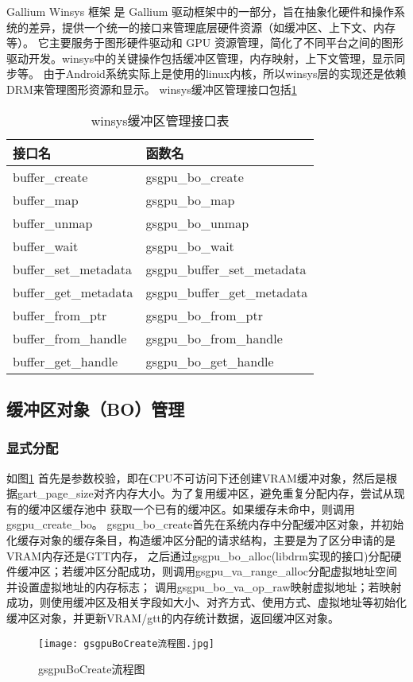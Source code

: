 Gallium Winsys 框架 是 Gallium 驱动框架中的一部分，旨在抽象化硬件和操作系统的差异，提供一个统一的接口来管理底层硬件资源（如缓冲区、上下文、内存等）。
它主要服务于图形硬件驱动和 GPU 资源管理，简化了不同平台之间的图形驱动开发。winsys中的关键操作包括缓冲区管理，内存映射，上下文管理，显示同步等。
由于Android系统实际上是使用的linux内核，所以winsys层的实现还是依赖DRM来管理图形资源和显示。
winsys缓冲区管理接口包括\ref{tab:winsys缓冲区管理接口表}

\begin{table}[h]
  \centering
  \caption{winsys缓冲区管理接口表}
  \label{tab:winsys缓冲区管理接口表}
  \begin{tabular}{ll}
    \toprule
    接口名  & 函数名 \\
    \midrule
    buffer\_create & gsgpu\_bo\_create  \\
    buffer\_map & gsgpu\_bo\_map \\
    buffer\_unmap & gsgpu\_bo\_unmap \\
    buffer\_wait & gsgpu\_bo\_wait \\
    buffer\_set\_metadata & gsgpu\_buffer\_set\_metadata \\
    buffer\_get\_metadata & gsgpu\_buffer\_get\_metadata \\
    buffer\_from\_ptr & gsgpu\_bo\_from\_ptr \\
    buffer\_from\_handle & gsgpu\_bo\_from\_handle \\
    buffer\_get\_handle & gsgpu\_bo\_get\_handle \\
    \bottomrule
  \end{tabular}
  \note{}
\end{table}

\subsection{缓冲区对象（BO）管理}

\subsubsection{显式分配}

如图\ref{fig:gsgpuBoCreate流程图}
首先是参数校验，即在CPU不可访问下还创建VRAM缓冲对象，然后是根据gart\_page\_size对齐内存大小。为了复用缓冲区，避免重复分配内存，尝试从现有的缓冲区缓存池中
获取一个已有的缓冲区。如果缓存未命中，则调用gsgpu\_create\_bo。
gsgpu\_bo\_create首先在系统内存中分配缓冲区对象，并初始化缓存对象的缓存条目，构造缓冲区分配的请求结构，主要是为了区分申请的是VRAM内存还是GTT内存，
之后通过gsgpu\_bo\_alloc(libdrm实现的接口)分配硬件缓冲区；若缓冲区分配成功，则调用gsgpu\_va\_range\_alloc分配虚拟地址空间并设置虚拟地址的内存标志；
调用gsgpu\_bo\_va\_op\_raw映射虚拟地址；若映射成功，则使用缓冲区及相关字段如大小、对齐方式、使用方式、虚拟地址等初始化缓冲区对象，并更新VRAM/gtt的内存统计数据，返回缓冲区对象。
\begin{figure}[h]
  \centering
  \texttt{[image: gsgpuBoCreate流程图.jpg]}
  \caption{gsgpuBoCreate流程图}
  \label{fig:gsgpuBoCreate流程图}
\end{figure}

